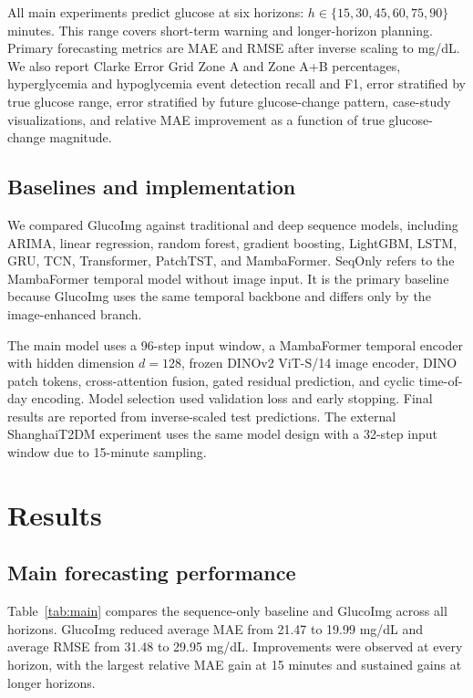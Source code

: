\documentclass[11pt]{article}
\begin{document}
All main experiments predict glucose at six horizons: \(h \in \{15, 30, 45, 60, 75, 90\}\) minutes. This range covers short-term warning and longer-horizon planning. Primary forecasting metrics are MAE and RMSE after inverse scaling to mg/dL. We also report Clarke Error Grid Zone A and Zone A+B percentages, hyperglycemia and hypoglycemia event detection recall and F1, error stratified by true glucose range, error stratified by future glucose-change pattern, case-study visualizations, and relative MAE improvement as a function of true glucose-change magnitude.

\subsection{Baselines and implementation}

We compared GlucoImg against traditional and deep sequence models, including ARIMA, linear regression, random forest, gradient boosting, LightGBM, LSTM, GRU, TCN, Transformer, PatchTST, and MambaFormer. SeqOnly refers to the MambaFormer temporal model without image input. It is the primary baseline because GlucoImg uses the same temporal backbone and differs only by the image-enhanced branch.

The main model uses a 96-step input window, a MambaFormer temporal encoder with hidden dimension \(d=128\), frozen DINOv2 ViT-S/14 image encoder, DINO patch tokens, cross-attention fusion, gated residual prediction, and cyclic time-of-day encoding. Model selection used validation loss and early stopping. Final results are reported from inverse-scaled test predictions. The external ShanghaiT2DM experiment uses the same model design with a 32-step input window due to 15-minute sampling.

\section{Results}

\subsection{Main forecasting performance}

Table~\ref{tab:main} compares the sequence-only baseline and GlucoImg across all horizons. GlucoImg reduced average MAE from 21.47 to 19.99 mg/dL and average RMSE from 31.48 to 29.95 mg/dL. Improvements were observed at every horizon, with the largest relative MAE gain at 15 minutes and sustained gains at longer horizons.
\end{document}
